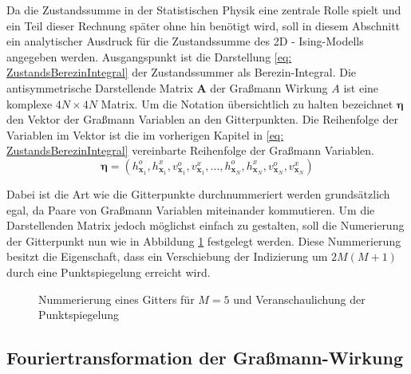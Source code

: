 
Da die Zustandssumme in der Statistischen Physik eine zentrale Rolle spielt und ein Teil dieser Rechnung später ohne hin benötigt wird, soll in diesem Abschnitt ein analytischer Ausdruck für die Zustandssumme des 2D - Ising-Modells angegeben werden.
Ausgangspunkt ist die Darstellung \eqref{eq: ZustandsBerezinIntegral} der Zustandssummer als Berezin-Integral.
Die antisymmetrische Darstellende Matrix $\bm A$ der Graßmann Wirkung $A$ ist eine komplexe $4N \times 4N$ Matrix. Um die Notation übersichtlich zu halten bezeichnet $\bm{\eta}$ den Vektor der Graßmann Variablen an den Gitterpunkten. Die Reihenfolge der Variablen im Vektor ist die im vorherigen Kapitel in \eqref{eq: ZustandsBerezinIntegral} vereinbarte Reihenfolge der Graßmann Variablen.
\begin{equation}
\bm{\eta} = \left(h_{\bm{x}_1}^o, h_{\bm{x}_1}^x, v_{\bm{x}_1}^o, v_{\bm{x}_1}^x, \dots, h_{\bm{x}_N}^o, h_{\bm{x}_N}^x, v_{\bm{x}_N}^o, v_{\bm{x}_N}^x \right)
\end{equation}

 \noindent Dabei ist die Art wie die Gitterpunkte durchnummeriert werden grundsätzlich egal, da Paare von Graßmann Variablen miteinander kommutieren. Um die Darstellenden Matrix jedoch möglichst einfach zu gestalten, soll die Numerierung der Gitterpunkt nun wie in Abbildung \ref{Abb: Numerierung} festgelegt werden. Diese Nummerierung besitzt die Eigenschaft, dass ein Verschiebung der Indizierung um $2M(M+1)$ durch eine Punktspiegelung erreicht wird. 

\begin{figure}[h!]
\centering

\caption{Nummerierung eines Gitters für $M=5$ und Veranschaulichung der Punktspiegelung}
\label{Abb: Numerierung}
\end{figure}

\subsection{Fouriertransformation der Graßmann-Wirkung}

